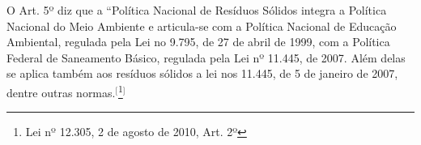 O Art. 5º diz que a “Política Nacional de Resíduos Sólidos integra a Política Nacional do Meio Ambiente e articula-se com a Política Nacional de Educação Ambiental, regulada pela Lei no 9.795, de 27 de abril de 1999, com a Política Federal de Saneamento Básico, regulada pela Lei nº 11.445, de 2007. Além delas se aplica também aos resíduos sólidos a lei nos 11.445, de 5 de janeiro de 2007, dentre outras normas.$^{[}$\footnote{Lei nº 12.305, 2 de agosto de 2010, Art. 2º}$^{]}$

